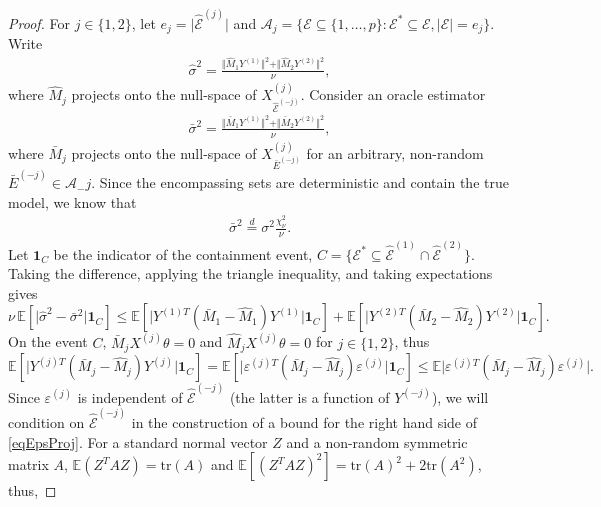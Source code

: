 \documentclass[10pt, reqno]{amsart}
\numberwithin{equation}{section}
\begin{document}
\begin{appendix}
\begin{proof}
	For $j\in \{1, 2\}$, let $e_j = \vert \hat{\mathcal{E}}^{(j)} \vert$ and $\mathcal{A}_j = \{\mathcal{E}\subseteq \{1, \ldots, p\} \colon \mathcal{E}^*\subseteq \mathcal{E}, \vert \mathcal{E}\vert = e_j \}$. Write 
	\begin{align}\label{eq:Estimator}
		\hat\sigma^2 = \frac{\Vert \hat M_1 Y^{(1)} \Vert^2 + \Vert \hat M_2 Y^{(2)} \Vert^2}{\nu},
	\end{align}
	where $\hat M_j$ projects onto the null-space of $X^{(j)}_{\hat{\mathcal{E}}^{(-j)}}$. Consider an oracle estimator 
	\begin{align}\label{eq:oracle-estimator}
		\bar\sigma^2 = \frac{\Vert \bar M_1 Y^{(1)} \Vert^2 + \Vert \bar M_2 Y^{(2)} \Vert^2}{\nu},
	\end{align}
	where $\bar M_j$ projects onto the null-space of $X^{(j)}_{\bar E^{(-j)}}$ for an arbitrary, non-random $\bar E^{(-j)}\in \mathcal A_-j$. Since the encompassing sets are deterministic and contain the true model, we know that
	\begin{align}\label{eq:chi-square}
		\bar\sigma^2 \stackrel{d}{=} \sigma^2 \frac{\chi^2_\nu}{\nu}. 
	\end{align}
	Let $\mathbf{1}_C$ be the indicator of the containment event, $C = \{\mathcal{E}^*\subseteq \hat{\mathcal{E}}^{(1)} \cap \hat{\mathcal{E}}^{(2)}\}$. Taking the difference, applying the triangle inequality, and taking expectations gives 
	\[
	\nu\, \mathbb{E} [\vert \hat\sigma^2 - \bar\sigma^2\vert \mathbf{1}_C]  \leq \mathbb{E}[\vert Y^{(1)T} (\bar M_1 - \hat M_1) Y^{(1)} \vert \mathbf{1}_C] + \mathbb{E}[\vert Y^{(2)T} (\bar M_2 - \hat M_2) Y^{(2)} \vert  \mathbf{1}_C].
	\]
	On the event $C$, $\bar M_j X^{(j)}\theta = 0$ and $\hat M_j X^{(j)}\theta = 0$ for $j\in \{1, 2\}$, thus
	\begin{equation}\label{eqEpsProj}
		\mathbb{E}[\vert Y^{(j)T} (\bar M_j - \hat M_j) Y^{(j)} \vert\mathbf{1}_C] =  \mathbb{E}[\vert \varepsilon^{(j)T} (\bar M_j - \hat M_j) \varepsilon^{(j)} \vert \mathbf{1}_C] \leq  \mathbb{E} \vert \varepsilon^{(j)T} (\bar M_j - \hat M_j) \varepsilon^{(j)} \vert. 
	\end{equation}
	Since $\varepsilon^{(j)}$ is independent of $\hat{\mathcal{E}}^{(-j)}$ (the latter is a function of $Y^{(-j)}$), we will condition on $\hat{\mathcal{E}}^{(-j)}$ in the construction of a bound for the right hand side of \eqref{eqEpsProj}. For a standard normal vector $Z$ and a non-random symmetric matrix $A$, $\mathbb{E}(Z^T A Z) = \text{tr}(A)$ and $\mathbb{E}[(Z^T A Z)^2] = \text{tr}(A)^2 + 2 \text{tr}(A^2)$, thus,

\end{proof}
\end{appendix}
\end{document}
